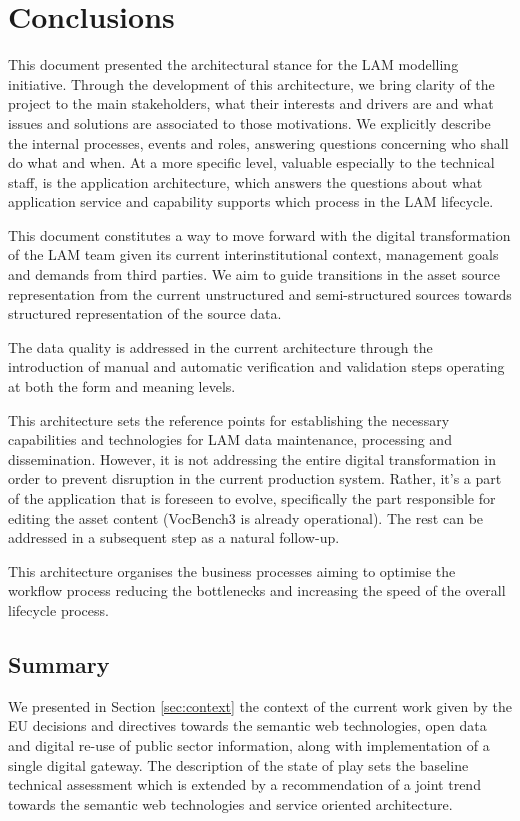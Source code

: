 \chapter{Conclusions}
\label{sec:conclusions}
	
	This document presented the architectural stance for the LAM modelling initiative. Through the development of this architecture, we bring clarity of the project to the main stakeholders, what their interests and drivers are and what issues and solutions are associated to those motivations. We explicitly describe the internal processes, events and roles, answering questions concerning who shall do what and when. At a more specific level, valuable especially to the technical staff, is the application architecture, which answers the questions about what application service and capability supports which process in the LAM lifecycle. 
	
	This document constitutes a way to move forward with the digital transformation of the LAM team given its current interinstitutional context, management goals and demands from third parties. We aim to guide transitions in the asset source representation from the current unstructured and semi-structured sources towards structured representation of the source data. 
	
    The data quality is addressed in the current architecture through the introduction of manual and automatic verification and validation steps operating at both the form and meaning levels.
    
    This architecture sets the reference points for establishing the necessary capabilities and technologies for LAM data maintenance, processing and dissemination. However, it is not addressing the entire digital transformation in order to prevent disruption in the current production system. Rather, it's a part of the application that is foreseen to evolve, specifically the part responsible for editing the asset content (VocBench3 is already operational). The rest can be addressed in a subsequent step as a natural follow-up. 
	
	This architecture organises the business processes aiming to optimise the workflow process reducing the bottlenecks and increasing the speed of the overall lifecycle process.  

	\section{Summary}

	We presented in Section \ref{sec:context} the context of the current work given by the EU decisions and directives towards the semantic web technologies, open data and digital re-use of public sector information, along with implementation of a single digital gateway. The description of the state of play sets the baseline technical assessment which is extended by a recommendation of a joint trend towards the semantic web technologies and service oriented architecture.
	
